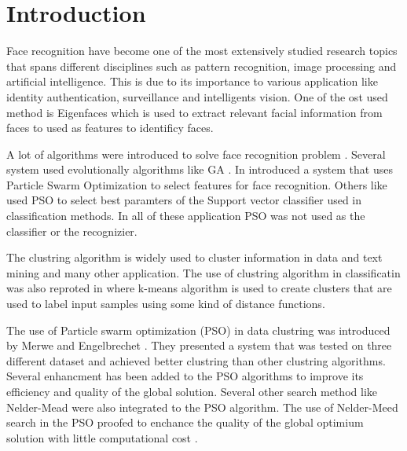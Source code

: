 \documentclass[a4paper,twoside]{article}
\begin{document}


%
\section{Introduction}

Face recognition have become one of the most extensively studied research topics that spans different disciplines such as pattern recognition, image processing and artificial intelligence. This is due to its importance to various application like identity authentication, surveillance and intelligents vision. One of the ost used method is Eigenfaces which is used to extract relevant facial information from faces to used as features to identificy faces\cite{Turk91}. 

A lot of algorithms were introduced to solve face recognition problem \cite{apperance2003,survey2003}. Several system used evolutionally algorithms like GA \cite{ga2004}.  In \cite {Ramadan2009} introduced a system that uses Particle Swarm Optimization to select features for face recognition.  Others like \cite{Wei20114390} used PSO to select best paramters of the Support vector classifier used in classification methods. In all of these application PSO was not used as the classifier or the recognizier. %


The clustring algorithm is widely used to cluster information in data and text mining and many other application. The use of clustring algorithm in classificatin was also reproted in \cite{Bagirov03unsupervisedand} where k-means algorithm is used to create clusters that are used to label input samples using some kind of distance functions. %

The use of Particle swarm optimization (PSO) in data clustring was introduced by Merwe and Engelbrechet \cite{psoclustering,Cheo2004}. They presented a system that was tested on three different dataset and achieved better clustring than other clustring algorithms. Several enhancment has been added to the PSO algorithms to improve its efficiency and quality of the global solution. Several other search method like Nelder-Mead \cite{neldermead}  were also  integrated to the PSO algorithm. The use of Nelder-Meed search in the PSO proofed to enchance the quality of the global optimium solution with little computational cost \cite{nelderMeadPSO}. 
\end{document}
